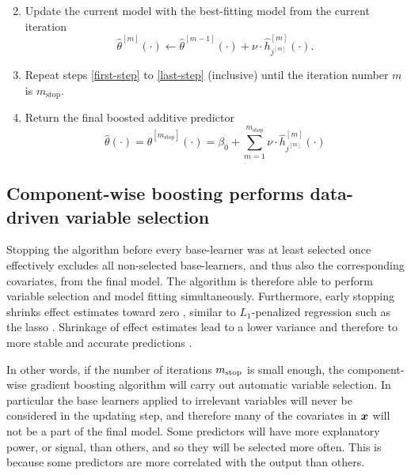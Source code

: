 \begin{algorithm}
\begin{enumerate}
\begin{equation*}
        \end{equation*}
    \item
        \label{last-step}
        Update the current model with the best-fitting model from the current iteration
        \begin{equation*}
            \hat{\theta}^{[m]}(\cdot)\gets \hat{\theta}^{[m-1]}(\cdot)+\nu\cdot \hat{h}_{j^{[m]}}^{[m]}(\cdot).
        \end{equation*}
    \item
        Repeat steps \ref{first-step} to \ref{last-step} (inclusive) until the iteration number $m$ is $m_{\text{stop}}$.
    \item
        Return the final boosted additive predictor
        \begin{equation*}
            \hat{\theta}(\cdot)=\hat{\theta}^{[m_{\text{stop}}]}(\cdot)=\beta_0+\sum_{m=1}^{m_{\text{stop}}}\nu\cdot\hat{h}_{j^{[m]}}^{[m]}(\cdot)
        \end{equation*}
\end{enumerate}
\end{algorithm}

\subsection{Component-wise boosting performs data-driven variable selection}
\label{sec:variable-selection}
Stopping the algorithm before every base-learner was at least selected once effectively excludes all non-selected base-learners, and thus also the corresponding covariates, from the final model.
The algorithm is therefore able to perform variable selection and model fitting simultaneously.
Furthermore, early stopping shrinks effect estimates toward zero \citep{buhlmann2007, DeBin2016}, similar to $L_1$-penalized regression
such as the lasso \citep{lasso, efron2004}.
Shrinkage of effect estimates lead to a lower variance and therefore to more stable and accurate predictions \citep{efron1975, copas1983, ESL}.


In other words, if the number of iterations $m_{\text{stop}}$ is small enough, the component-wise gradient boosting algorithm will carry out automatic variable selection.
In particular the base learners applied to irrelevant variables will never be considered in the updating step, and therefore many of the covariates in $\bm{x}$ will not be a part of the final model.
Some predictors will have more explanatory power, or signal, than others, and so they will be selected more often.
This is because some predictors are more correlated with the output than others.

